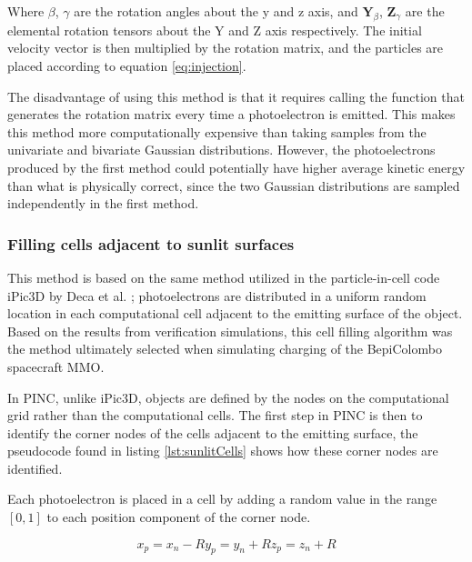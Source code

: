 Where $\beta$, $\gamma$ are the rotation angles about the y and z axis, and $\pmb{Y}_{\beta}$, $\pmb{Z}_{\gamma}$ are the elemental rotation tensors about the Y and Z axis respectively. The initial velocity vector is then multiplied by the rotation matrix, and the particles are placed according to equation \eqref{eq:injection}.

The disadvantage of using this method is that it requires calling the function that generates the rotation matrix every time a photoelectron is emitted. This makes this method more computationally expensive than taking samples from the univariate and bivariate Gaussian distributions. However, the photoelectrons produced by the first method could potentially have higher average kinetic energy than what is physically correct, since the two Gaussian distributions are sampled independently in the first method.



\subsubsection*{Filling cells adjacent to sunlit surfaces}
This method is based on the same method utilized in the particle-in-cell code iPic3D by Deca et al. \parencite{Deca2013}; photoelectrons are distributed in a uniform random location in each computational cell adjacent to the emitting surface of the object. Based on the results from verification simulations, this cell filling algorithm was the method ultimately selected when simulating charging of the BepiColombo spacecraft MMO.

In PINC, unlike iPic3D, objects are defined by the nodes on the computational grid rather than the computational cells. The first step in PINC is then to identify the corner nodes of the cells adjacent to the emitting surface, the pseudocode found in listing \ref{lst:sunlitCells} shows how these corner nodes are identified.

Each photoelectron is placed in a cell by adding a random value in the range $[0,1]$ to each position component of the corner node. 

\begin{subequations}
    \begin{equation}\label{eq:cellFillX}
        x_{p} = x_{n} - R
    \end{equation}
    \begin{equation}
        y_{p} = y_{n} + R
    \end{equation}
    \begin{equation}
        z_{p} = z_{n} + R
    \end{equation}
\end{subequations}

